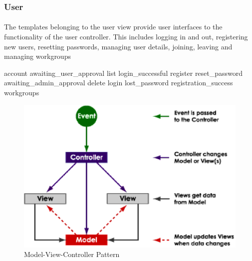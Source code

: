 \subsubsection{User}
\label{sec:view_user}

\paragraph{}
The templates belonging to the user view provide user interfaces to the functionality of the user controller. This includes logging in and out, registering new users, resetting passwords, managing user details, joining, leaving and managing workgroups


account                  awaiting_user_approval  list   login_successful  register              reset_password
awaiting_admin_approval  delete                  login  lost_password     registration_success  workgroups

\begin{figure}[h]
\centering
\includegraphics[scale=0.6]{images/mvc}
\caption{Model-View-Controller Pattern}\label{fig:mvc}
\end{figure}
